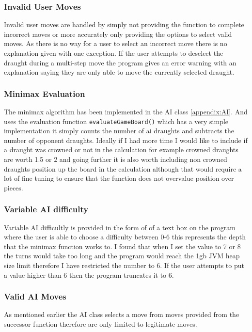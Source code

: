 \documentclass[a4paper,12pt]{scrartcl}
\begin{document}
{{			\subsubsection{Invalid User Moves}{Invalid user moves are handled by simply not providing the function to complete incorrect moves or more accurately only providing the options to select valid moves. As there is no way for a user to select an incorrect move there is no explanation given with one exception. If the user attempts to deselect the draught during a multi-step move the program gives an error warning with an explanation saying they are only able to move the currently selected draught.
			}
			\subsubsection{Minimax Evaluation}{
				The minimax algorithm has been implemented in the AI class \cref{appendix:AI}. And uses the evaluation function \lstinline|evaluateGameBoard()| which has a very simple implementation it simply counts the number of ai draughts and subtracts the number of opponent draughts. Ideally if I had more time I would like to include if a draught was crowned or not in the calculation for example crowned draughts are worth 1.5 or 2 and going further it is also worth including non crowned draughts position up the board in the calculation although that would require a lot of fine tuning to ensure that the function does not overvalue position over pieces.
			}
			\subsubsection{Variable AI difficulty}{
				Variable AI difficultly is provided in the form of of a text box on the program where the user is able to choose a difficulty between 0-6 this represents the depth that the minimax function works to. I found that when I set the value to 7 or 8 the turns would take too long and the program would reach the 1gb JVM heap size limit therefore I have restricted the number to 6. If the user attempts to put a value higher than 6 then the program truncates it to 6.
			}
			\subsubsection{Valid AI Moves}{As mentioned earlier the AI class selects a move from moves provided from the successor function therefore are only limited to legitimate moves.}
}}
\end{document}
